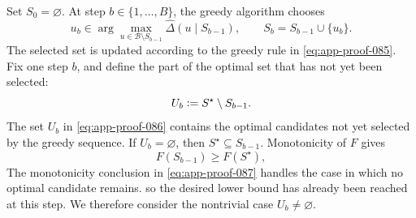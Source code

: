 \documentclass[11pt]{article}
\numberwithin{equation}{section}
\newcommand{\1}{\mathbf 1}
\newcommand{\cB}{\mathcal B}
\newcommand{\defeq}{\vcentcolon=}
\begin{document}
Set \(S_0=\varnothing\).  At step \(b\in\{1,\ldots,B\}\), the greedy
algorithm chooses
\begin{equation}
\label{eq:app-proof-085}
u_b
  \in
  \arg\max_{u\in\cB\setminus S_{b-1}}
  \widehat\Delta(u\mid S_{b-1}),
  \qquad
  S_b=S_{b-1}\cup\{u_b\}.
\end{equation}
The selected set is updated according to the greedy rule in
\eqref{eq:app-proof-085}.
Fix one step \(b\), and define the part of the optimal set that has not
yet been selected:
\begin{equation}
\label{eq:app-proof-086}
U_b\defeq S^\star\setminus S_{b-1}.
\end{equation}
The set \(U_b\) in \eqref{eq:app-proof-086} contains the optimal candidates
not yet selected by the greedy sequence.
If \(U_b=\varnothing\), then \(S^\star\subseteq S_{b-1}\).  Monotonicity of
\(F\) gives
\begin{equation}
\label{eq:app-proof-087}
F(S_{b-1})\ge F(S^\star),
\end{equation}
The monotonicity conclusion in \eqref{eq:app-proof-087} handles the case in
which no optimal candidate remains.
so the desired lower bound has already been reached at this step.  We
therefore consider the nontrivial case \(U_b\ne\varnothing\).
\end{document}
